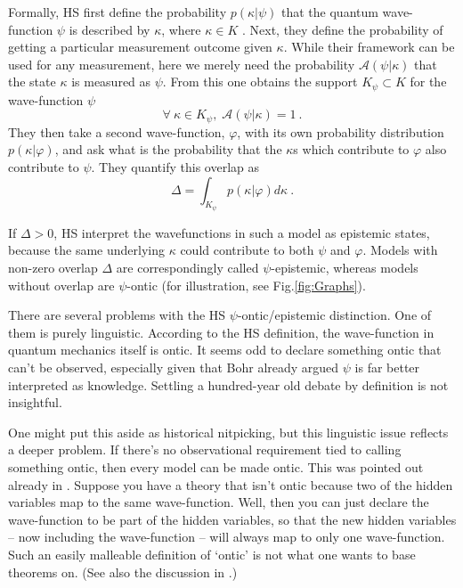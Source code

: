 \documentclass[superscriptaddress,twocolumn,floatfix,nofootinbib]{revtex4-2}
\begin{document}
Formally, HS first define the probability $p(\kappa\vert\psi)$ that the quantum wave-function $\psi$ is described by $\kappa$, where $\kappa \in K$ \cite{Harrigan2007ProbDistn,Maroney2012Statistical}. Next, they define the probability of getting a particular measurement outcome given $\kappa$. While their framework can be used for any measurement, here we merely need the probability $\mathcal{A}(\psi|\kappa)$ that the state $\kappa$ is measured as $\psi$. From this one obtains the support $K_\psi \subset K$ for the wave-function $\psi$ 
\begin{equation}
    \forall~\kappa\in K_\psi,\;\mathcal{A}(\psi\vert\kappa) = 1 ~.
\end{equation}
They then take a second wave-function, $\varphi$, with its own probability distribution $p(\kappa\vert\varphi)$, and ask what is the probability that the $\kappa$s which contribute to $\varphi$ also contribute to $\psi$. They quantify this overlap as
\begin{equation}
\Delta =\int_{K_\psi} p(\kappa\vert\varphi) d\kappa~.
\end{equation}

If $\Delta>0$, HS interpret the wavefunctions in such a model as epistemic states, because the same underlying $\kappa$ could contribute to both $\psi$ and $\varphi$. Models with non-zero overlap $\Delta$ are correspondingly called $\psi$-epistemic, whereas models without overlap are $\psi$-ontic (for illustration, see Fig.\ref{fig:Graphs}).

There are several problems with the HS $\psi$-ontic/epistemic distinction. One of them is purely linguistic. According to the HS definition, the wave-function in quantum mechanics itself is ontic. It seems odd to declare something ontic that can't be observed, especially given that Bohr already argued $\psi$ is far better interpreted as knowledge. Settling a hundred-year old debate by definition is not insightful. 

One might put this aside as historical nitpicking, but this linguistic issue reflects a deeper problem. If there's no observational requirement tied to calling something ontic, then every model can be made ontic. This was pointed out already in \cite{Schlosshauer2012Implications}. Suppose you have a theory that isn't ontic because two of the hidden variables map to the same wave-function. Well, then you can just declare the wave-function to be part of the hidden variables, so that the new hidden variables -- now including the wave-function -- will always map to only one wave-function. Such an easily malleable definition of `ontic' is not what one wants to base theorems on.
(See also the discussion in \cite{Leifer_2014}.)
\end{document}
